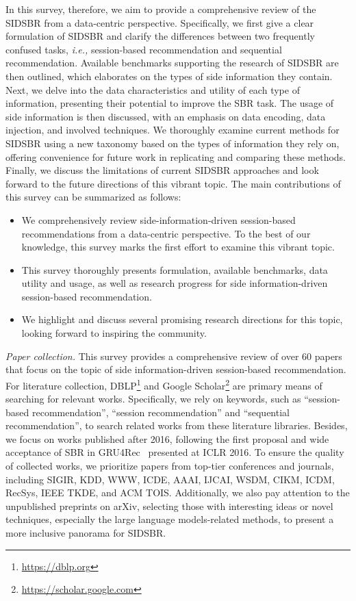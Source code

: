 \documentclass[lettersize,journal]{IEEEtran}
\newcommand{\ie}{\emph{i.e.,}\xspace}
\newcommand{\baby}{{SIDSBR}\xspace}
\begin{document}
In this survey, therefore, we aim to provide a comprehensive review of the \baby from a data-centric perspective. Specifically, we first give a clear formulation of \baby and clarify the differences between two frequently confused tasks, \ie session-based recommendation and sequential recommendation. Available benchmarks supporting the research of \baby are then outlined, which elaborates on the types of side information they contain. Next, we delve into the data characteristics and utility of each type of information, presenting their potential to improve the SBR task. The usage of side information is then discussed, with an emphasis on data encoding, data injection, and involved techniques. We thoroughly examine current methods for \baby using a new taxonomy based on the types of information they rely on, offering convenience for future work in replicating and comparing these methods. Finally, we discuss the limitations of current \baby approaches and look forward to the future directions of this vibrant topic.
The main contributions of this survey can be summarized as follows:
\begin{itemize}
    \item We comprehensively review side-information-driven session-based recommendations from a data-centric perspective. To the best of our knowledge, this survey marks the first effort to examine this vibrant topic. 
    
    \item This survey thoroughly presents formulation, available benchmarks, data utility and usage, as well as research progress for side information-driven session-based recommendation. 

    \item We highlight and discuss several promising research directions for this topic, looking forward to inspiring the community.
    
\end{itemize}


\textit{Paper collection.}
This survey provides a comprehensive review of over 60 papers that focus on the topic of side information-driven session-based recommendation. For literature collection, DBLP\footnote{\url{https://dblp.org}} and Google Scholar\footnote{\url{https://scholar.google.com}} are primary means of searching for relevant works. Specifically, we rely on keywords, such as ``session-based recommendation'', ``session recommendation'' and ``sequential recommendation'', to search related works from these literature libraries. Besides, we focus on works published after 2016, following the first proposal and wide acceptance of SBR in GRU4Rec~\cite{GRU4Rec} presented at ICLR 2016. To ensure the quality of collected works, we prioritize papers from top-tier conferences and journals, including SIGIR, KDD, WWW, ICDE, AAAI, IJCAI, WSDM, CIKM, ICDM, RecSys, IEEE TKDE, and ACM TOIS. Additionally, we also pay attention to the unpublished preprints on arXiv, selecting those with interesting ideas or novel techniques, especially the large language models-related methods, to present a more inclusive panorama for \baby.
\end{document}
